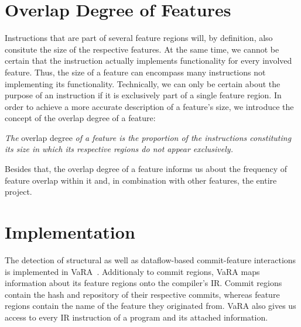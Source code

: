 \section{Overlap Degree of Features}\label{sec:feature_overlap_degree}
Instructions that are part of several feature regions will, by definition, also consitute the size of the respective features.
At the same time, we cannot be certain that the instruction actually implements functionality for every involved feature.
Thus, the size of a feature can encompass many instructions not implementing its functionality.
Technically, we can only be certain about the purpose of an instruction if it is exclusively part of a single feature region.
In order to achieve a more accurate description of a feature's size, we introduce the concept of the overlap degree of a feature:
\begin{definition} \label{def:feature_overlap_degree}
\emph{The} overlap degree \emph{of a feature is the proportion of the instructions constituting its size in which its respective regions do not appear exclusively.}
\end{definition}
Besides that, the overlap degree of a feature informs us about the frequency of feature overlap within it and, in combination with other features, the entire project.

\section{Implementation}\label{ch:implementation}

The detection of structural as well as dataflow-based commit-feature interactions is implemented in VaRA~\cite{VaRA2023}.
Additionaly to commit regions, VaRA maps information about its feature regions onto the compiler's IR.
Commit regions contain the hash and repository of their respective commits, whereas feature regions contain the name of the feature they originated from.
VaRA also gives us access to every IR instruction of a program and its attached information.

